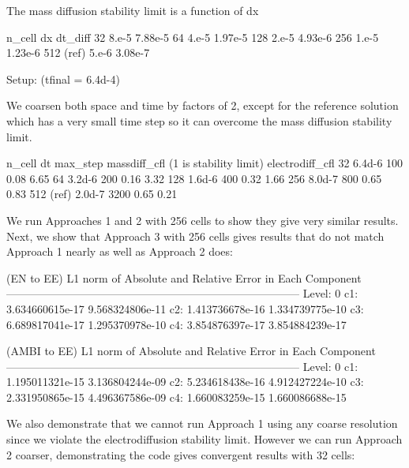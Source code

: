 \documentclass[final]{siamltex}
\begin{document}
The mass diffusion stability limit is a function of dx

n_cell       dx       dt_diff
32           8.e-5    7.88e-5
64           4.e-5    1.97e-5
128          2.e-5    4.93e-6
256          1.e-5    1.23e-6
512 (ref)    5.e-6    3.08e-7

Setup: (tfinal = 6.4d-4)

We coarsen both space and time by factors of 2, except for the reference solution which has
a very small time step so it can overcome the mass diffusion stability limit.

n_cell       dt       max_step   massdiff_cfl (1 is stability limit)  electrodiff_cfl
32           6.4d-6   100        0.08                                 6.65
64           3.2d-6   200        0.16                                 3.32
128          1.6d-6   400        0.32                                 1.66
256          8.0d-7   800        0.65                                 0.83
512 (ref)    2.0d-7   3200       0.65                                 0.21

We run Approaches 1 and 2 with 256 cells to show they give very similar results.
Next, we show that Approach 3 with 256 cells gives results that do not match
Approach 1 nearly as well as Approach 2 does:

(EN to EE) L1 norm of Absolute and Relative Error in Each Component
--------------------------------------------------------------------------------
Level:  0
                                c1:      3.634660615e-17     9.568324806e-11
                                c2:      1.413736678e-16     1.334739775e-10
                                c3:      6.689817041e-17     1.295370978e-10
                                c4:      3.854876397e-17     3.854884239e-17

(AMBI to EE) L1 norm of Absolute and Relative Error in Each Component
--------------------------------------------------------------------------------
Level:  0
                                c1:      1.195011321e-15     3.136804244e-09
                                c2:      5.234618438e-16     4.912427224e-10
                                c3:      2.331950865e-15     4.496367586e-09
                                c4:      1.660083259e-15     1.660086688e-15

We also demonstrate that we cannot run Approach 1 using any coarse resolution
since we violate the electrodiffusion stability limit.  However we can run
Approach 2 coarser, demonstrating the code gives convergent results with 32 cells:
\end{document}
